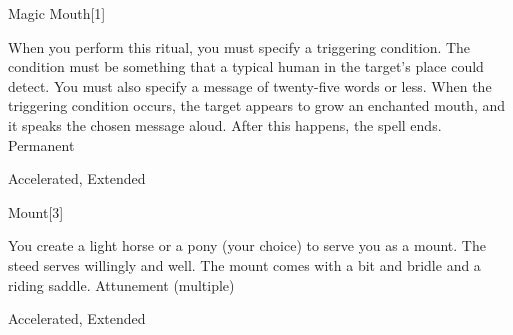 \begin{spellsection}{Magic Mouth}[1]
\begin{spellcontent}
\begin{spelltargetinginfo}
\end{spelltargetinginfo}
\begin{spelleffects}
\spellspecial
When you perform this ritual, you must specify a triggering condition.
The condition must be something that a typical human in the target's place could detect.
You must also specify a message of twenty-five words or less.
\spelleffect
When the triggering condition occurs, the target appears to grow an enchanted mouth, and it speaks the chosen message aloud.
After this happens, the spell ends.
\spelldur Permanent
\end{spelleffects}
\end{spellcontent}
\begin{spellfooter}
 Accelerated, Extended
\end{spellfooter}
\begin{spellsubcontent}
\end{spellsubcontent}
\end{spellsection}
\begin{spellsection}{Mount}[3]
\begin{spellcontent}
\begin{spelltargetinginfo}
\spellrng{\rngclose}
\end{spelltargetinginfo}
\begin{spelleffects}
\spelleffect
You create a light horse or a pony (your choice) to serve you as a mount.
The steed serves willingly and well.
The mount comes with a bit and bridle and a riding saddle.
\spelldur Attunement (multiple)
\end{spelleffects}
\end{spellcontent}
\begin{spellfooter}
 Accelerated, Extended
\end{spellfooter}
\begin{spellsubcontent}
\end{spellsubcontent}
\end{spellsection}
